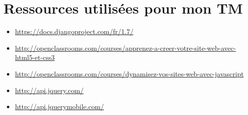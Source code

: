 \documentclass[a4paper,12pt,oneside]{sphinxmanual}
\begin{document}
\chapter{Ressources utilisées pour mon TM}
\label{ressources::doc}\label{ressources:ressources-utilisees-pour-mon-tm}\begin{itemize}
\item {} 
\href{https://docs.djangoproject.com/fr/1.7/}{https://docs.djangoproject.com/fr/1.7/}

\item {} 
\href{http://openclassrooms.com/courses/apprenez-a-creer-votre-site-web-avec-html5-et-css3}{http://openclassrooms.com/courses/apprenez-a-creer-votre-site-web-avec-html5-et-css3}

\item {} 
\href{http://openclassrooms.com/courses/dynamisez-vos-sites-web-avec-javascript}{http://openclassrooms.com/courses/dynamisez-vos-sites-web-avec-javascript}

\item {} 
\href{http://api.jquery.com/}{http://api.jquery.com/}

\item {} 
\href{http://api.jquerymobile.com/}{http://api.jquerymobile.com/}

\end{itemize}



\renewcommand{\indexname}{Index}
\printindex
\end{document}

